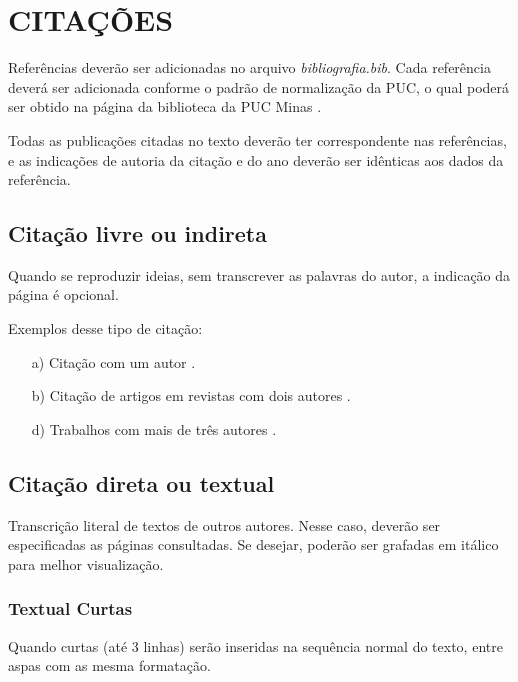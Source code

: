    
\chapter{\uppercase{Citações}}


Referências deverão ser adicionadas no arquivo \textit{bibliografia.bib}. Cada referência deverá ser adicionada conforme o padrão de normalização da PUC, 
o qual poderá ser obtido na página da biblioteca da PUC Minas \cite{manualpuc}. 

Todas as publicações citadas no texto deverão ter correspondente nas referências, e as indicações de autoria da citação e do ano deverão ser idênticas aos dados da referência.


\section{\hspace{-0.3cm}Citação livre ou indireta}

Quando se reproduzir ideias, sem transcrever as palavras do autor, a indicação da página é opcional.

Exemplos desse tipo de citação:
\begin{enumerate} 
 \item [a)] Citação com um autor \cite{knuth}. 
 \item [b)] Citação de artigos em revistas com dois autores \cite{artigo01}.
 \item [d)] Trabalhos com mais de três autores \cite{congresso}.
\end{enumerate}

\section{\hspace{-0.3cm}Citação direta ou textual}

Transcrição literal de textos de outros autores. Nesse caso, deverão ser especificadas as páginas consultadas. 
Se desejar, poderão ser grafadas em itálico para melhor visualização.

\subsection{\hspace{-0.3cm}Textual Curtas}

Quando curtas (até 3 linhas) serão inseridas na sequência normal do texto, entre aspas com as mesma formatação.

